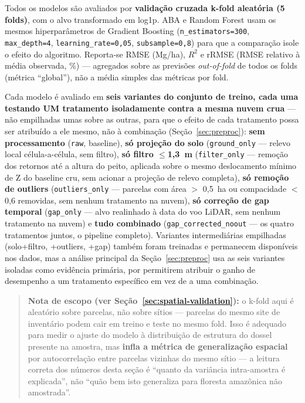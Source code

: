 Todos os modelos são avaliados por \textbf{validação cruzada k-fold aleatória
(5 folds)}, com o alvo transformado em log1p. ABA e Random Forest usam os mesmos
hiperparâmetros de Gradient Boosting (\texttt{n\_estimators=300}, \texttt{max\_depth=4},
\texttt{learning\_rate=0,05}, \texttt{subsample=0,8}) para que a comparação isole
o efeito do algoritmo. Reporta-se RMSE (Mg/ha), $R^2$ e rRMSE (RMSE relativo à
média observada, \%) --- agregados sobre as previsões \textit{out-of-fold} de
todos os folds (métrica ``global''), não a média simples das métricas por fold.

Cada modelo é avaliado em \textbf{seis variantes do conjunto de treino, cada uma
testando UM tratamento isoladamente contra a mesma nuvem crua} --- não empilhadas
umas sobre as outras, para que o efeito de cada tratamento possa ser atribuído a
ele mesmo, não à combinação (Seção~\ref{sec:preproc}): \textbf{sem processamento}
(\texttt{raw}, baseline), \textbf{só projeção do solo} (\texttt{ground\_only} ---
relevo local célula-a-célula, sem filtro), \textbf{só filtro $\leq$1,3~m}
(\texttt{filter\_only} --- remoção dos retornos até a altura do peito, aplicada
sobre o mesmo deslocamento mínimo de Z do baseline cru, sem acionar a projeção de
relevo completa), \textbf{só remoção de outliers} (\texttt{outliers\_only} ---
parcelas com área $>$ 0,5~ha ou compacidade $<$ 0,6 removidas, sem nenhum
tratamento na nuvem), \textbf{só correção de gap temporal} (\texttt{gap\_only} ---
alvo realinhado à data do voo LiDAR, sem nenhum tratamento na nuvem) e
\textbf{tudo combinado} (\texttt{gap\_corrected\_noout} --- os quatro tratamentos
juntos, o pipeline completo). Variantes intermediárias empilhadas (solo+filtro,
+outliers, +gap) também foram treinadas e permanecem disponíveis nos dados, mas a
análise principal da Seção~\ref{sec:preproc} usa as seis variantes isoladas como
evidência primária, por permitirem atribuir o ganho de desempenho a um tratamento
específico em vez de a uma combinação.

\begin{quote}
\textbf{Nota de escopo (ver Seção~\ref{sec:spatial-validation}):} o k-fold aqui é
aleatório sobre parcelas, não sobre sítios --- parcelas do mesmo site de
inventário podem cair em treino e teste no mesmo fold. Isso é adequado para medir
o ajuste do modelo à distribuição de estrutura do dossel presente na amostra, mas
\textbf{infla a métrica de generalização espacial} por autocorrelação entre
parcelas vizinhas do mesmo sítio --- a leitura correta dos números desta seção é
``quanto da variância intra-amostra é explicada'', não ``quão bem isto generaliza
para floresta amazônica não amostrada''.
\end{quote}
